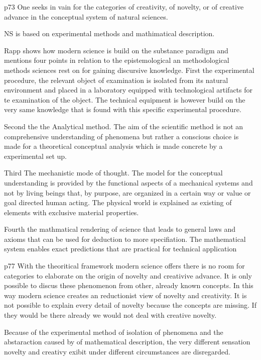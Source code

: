 %

p73
One seeks in vain for the categories of creativity, of novelty, or of creative advance in the conceptual system of natural sciences.

NS is based on experimental methods and mathimatical description.

Rapp shows how modern science is build on the substance paradigm and mentions four points in relation to the epistemological an methodological methods sciences rest on for gaining discursive knowledge.
First the experimental procedure, the relevant object of examination is isolated from its natural environment and placed in a laboratory equipped with technological artifacts for te examination of the object. The technical equipment is however build on the very same knowledge that is found with this specific experimental procedure.

Second the the Analytical method. The aim of the scientific method is not an comprehensive understanding of phenomena but rather a conscious choice is made for a theoretical conceptual analysis which is made concrete by a experimental set up.

Third The mechanistic mode of thought. The model for the conceptual understanding is provided by the functional aspects of a mechanical systems and not by living beings that, by purpose, are organized in a certain way or value or goal directed human acting. The physical world is explained as existing of elements with exclusive material properties.

Fourth the mathmatical rendering of science that leads to general laws and axioms that can be used for deduction to more specifiation. The mathematical system enables exact predictions that are practical for technical application

p77
With the theoritical framework modern science offers there is no room for categories to elaborate on the origin of novelty and creativive advance. It is only possible to discus these phenomenon from other, already known concepts.
In this way modern science creates an reductionist view of novelty and creativity. It is not possible to explain every detail of novelty because the concepts are missing. If they would be there already we would not deal with creative novelty.

Because of the experimental method of isolation of phenomena and the abstaraction caused by of mathematical description, the very different sensation novelty and creativy exibit under different circumstances are disregarded.

